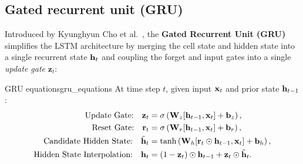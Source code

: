 \documentclass[../../main.tex]{subfiles}
\begin{document}
\subsection{Gated recurrent unit (GRU)}
Introduced by Kyunghyun Cho et al.~\cite{cho2014}, the \textbf{Gated Recurrent Unit (GRU)} simplifies the LSTM architecture by merging the cell state and hidden state into a single recurrent state $\mathbf{h}_t$ and coupling the forget and input gates into a single \emph{update gate} $\mathbf{z}_t$:

\begin{definition}{GRU equations}{gru_equations}
At time step $t$, given input $\mathbf{x}_t$ and prior state $\mathbf{h}_{t-1}$:
\begin{align}
\text{Update Gate:} \quad \mathbf{z}_t &= \sigma\left( \mathbf{W}_z [\mathbf{h}_{t-1}, \mathbf{x}_t] + \mathbf{b}_z \right), \label{eq:gru_update} \\
\text{Reset Gate:} \quad \mathbf{r}_t &= \sigma\left( \mathbf{W}_r [\mathbf{h}_{t-1}, \mathbf{x}_t] + \mathbf{b}_r \right), \label{eq:gru_reset} \\
\text{Candidate Hidden State:} \quad \tilde{\mathbf{h}}_t &= \tanh\left( \mathbf{W}_h [\mathbf{r}_t \odot \mathbf{h}_{t-1}, \mathbf{x}_t] + \mathbf{b}_h \right), \label{eq:gru_candidate} \\
\text{Hidden State Interpolation:} \quad \mathbf{h}_t &= (1 - \mathbf{z}_t) \odot \mathbf{h}_{t-1} + \mathbf{z}_t \odot \tilde{\mathbf{h}}_t. \label{eq:gru_hidden}
\end{align}
\end{definition}
\end{document}
